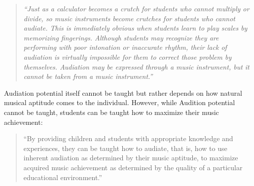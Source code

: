 \begin{quote}
	\textit{“Just as a calculator becomes a crutch for students who cannot multiply or divide, so music instruments become crutches for students who cannot audiate. This is immediately obvious when students learn to play scales by memorizing fingerings. Although students may recognize they are performing with poor intonation or inaccurate rhythm, their lack of audiation is virtually impossible for them to correct those problem by themselves. Audiation may be expressed through a music instrument, but it cannot be taken from a music instrument.”}\\
\end{quote}

Audiation potential itself cannot be taught but rather depends on how natural musical aptitude comes to the individual. However, while Audition potential cannot be taught, students can be taught how to maximize their music achievement:\\

\begin{quote}
	“By providing children and students with appropriate knowledge and experiences, they can be taught how to audiate, that is, how to use inherent audiation as determined by their music aptitude, to maximize acquired music achievement as determined by the quality of a particular educational environment.”\\
\end{quote}

